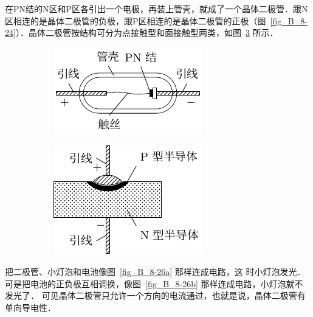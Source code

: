 在PN结的N区和P区各引出一个电极，再装上管壳，就成了一个晶体二极管．跟N区相连的是晶体二极管的负极，跟P区相连的是晶体二极管的正极（图~\ref{fig_B_8-24}）．晶体二极管按结构可分为点接触型和面接触型两类，如图~\ref{fig_B_8-25} 所示．
\begin{figure}[htbp]
    \centering
    \begin{subfigure}{0.4\linewidth}
        \centering
        \includegraphics{fig/B/8-25a.pdf}
        \caption{}\label{fig_B_8-25a}
    \end{subfigure}
    \hfil
    \begin{subfigure}{0.4\linewidth}
        \centering
        \includegraphics{fig/B/8-25b.pdf}
        \caption{}\label{fig_B_8-25b}
    \end{subfigure}
    \caption{}\label{fig_B_8-25}
\end{figure}



把二极管、小灯泡和电池像图~\ref{fig_B_8-26a} 那样连成电路，这
时小灯泡发光．
可是把电池的正负极互相调换，像图~\ref{fig_B_8-26b} 那样连成电路，小灯泡就不发光了．
可见晶体二极管只允许一个方向的电流通过，也就是说，晶体二极管有单向导电性．

